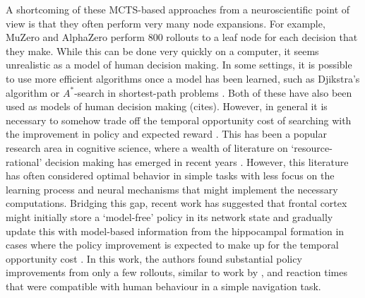 A shortcoming of these MCTS-based approaches from a neuroscientific point of view is that they often perform very many node expansions.
For example, MuZero and AlphaZero perform 800 rollouts to a leaf node for each decision that they make.
While this can be done very quickly on a computer, it seems unrealistic as a model of human decision making.
In some settings, it is possible to use more efficient algorithms once a model has been learned, such as Djikstra's algorithm or $A^*$-search in shortest-path problems \citep{hart1968formal}.
Both of these have also been used as models of human decision making (cites).
However, in general it is necessary to somehow trade off the temporal opportunity cost of searching with the improvement in policy and expected reward \citep{botvinick2014computational}.
This has been a popular research area in cognitive science, where a wealth of literature on `resource-rational' decision making has emerged in recent years \citep{griffiths2019doing,callaway2022rational}.
However, this literature has often considered optimal behavior in simple tasks with less focus on the learning process and neural mechanisms that might implement the necessary computations.
Bridging this gap, recent work has suggested that frontal cortex might initially store a `model-free' policy in its network state and gradually update this with model-based information from the hippocampal formation in cases where the policy improvement is expected to make up for the temporal opportunity cost \citep{jensen2023recurrent}.
In this work, the authors found substantial policy improvements from only a few rollouts, similar to work by \citep{vul2014one}, and reaction times that were compatible with human behaviour in a simple navigation task.

